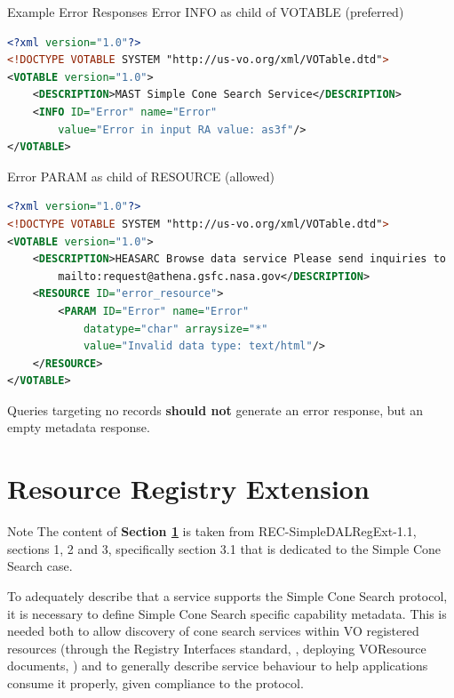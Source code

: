 \documentclass[11pt,a4paper]{ivoa}
\begin{document}
\begin{bigdescription} 
	\item[Example Error Responses] Error INFO as child of VOTABLE (preferred)\\

\begin{lstlisting}[language=XML,basicstyle=\footnotesize]
<?xml version="1.0"?>
<!DOCTYPE VOTABLE SYSTEM "http://us-vo.org/xml/VOTable.dtd">
<VOTABLE version="1.0">
	<DESCRIPTION>MAST Simple Cone Search Service</DESCRIPTION>
	<INFO ID="Error" name="Error"
		value="Error in input RA value: as3f"/>
</VOTABLE> 
\end{lstlisting} 

Error PARAM as child of RESOURCE (allowed)

\begin{lstlisting}[language=XML,basicstyle=\footnotesize]
<?xml version="1.0"?>
<!DOCTYPE VOTABLE SYSTEM "http://us-vo.org/xml/VOTable.dtd">
<VOTABLE version="1.0">
	<DESCRIPTION>HEASARC Browse data service Please send inquiries to
		mailto:request@athena.gsfc.nasa.gov</DESCRIPTION>
	<RESOURCE ID="error_resource">
		<PARAM ID="Error" name="Error" 
			datatype="char" arraysize="*" 
			value="Invalid data type: text/html"/>
	</RESOURCE>
</VOTABLE>
\end{lstlisting}

\end{bigdescription}

Queries targeting no records \textbf{should not} generate an error
response, but an empty metadata response.

\section{Resource Registry Extension} \label{sec:regext}

\begin{admonition}{Note} The content of \textbf{Section
\ref{sec:regext}} is taken from REC-SimpleDALRegExt-1.1, sections 1, 2
and 3, specifically section 3.1 that is dedicated to the Simple Cone
Search case.  \end{admonition}

To adequately describe that a service supports the Simple Cone Search
protocol, it is necessary to define Simple Cone Search specific
capability metadata. This is needed both to allow discovery of cone
search services within VO registered resources (through the Registry
Interfaces standard, \citet{std:RI1}, deploying VOResource documents,
\citet{std:VOR}) and to generally describe service behaviour to help
applications consume it properly, given compliance to the protocol.
\end{document}
